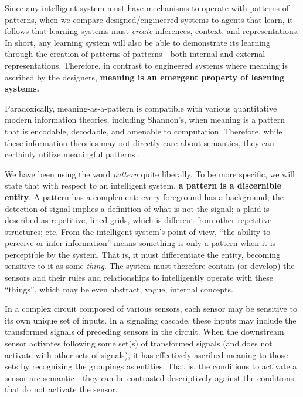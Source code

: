 Since any intelligent system must have mechanisms to operate with patterns of patterns, when we compare designed/engineered systems to agents that learn, it follows that learning systems must \emph{create} inferences, context, and representations.
In short, any learning system will also be able to demonstrate its learning through the creation of patterns of patterns---both internal and external representations.
Therefore, in contrast to engineered systems where meaning is ascribed by the designers, \textbf{meaning is an emergent property of learning systems.}

Paradoxically, meaning-as-a-pattern is compatible with various quantitative modern information theories, including Shannon's, when meaning is a pattern that is encodable, decodable, and amenable to computation.
Therefore, while these information theories may not directly care about semantics, they can certainly utilize meaningful patterns \cite{adriaansCriticalAnalysisFloridi2010, adriaansInformation2020}.

We have been using the word \emph{pattern} quite liberally.
To be more specific, we will state that with respect to an intelligent system, \textbf{a pattern is a discernible entity}.
A pattern has a complement: every foreground has a background; the detection of signal implies a definition of what is not the signal; a plaid is described as repetitive, lined grids, which is different from other repetitive structures; etc.
From the intelligent system's point of view, ``the ability to perceive or infer information'' means something is only a pattern when it is perceptible by the system.
That is, it must differentiate the entity, becoming sensitive to it as some \emph{thing}.
The system must therefore contain (or develop) the sensors and their rules and relationships to intelligently operate with these ``things'', which may be even abstract, vague, internal concepts.


In a complex circuit composed of various sensors, each sensor may be sensitive to its own unique set of inputs.
In a signaling cascade, these inputs may include the transformed signals of preceding sensors in the circuit.
When the downstream sensor activates following some set(s) of transformed signals (and does not activate with other sets of signals), it has effectively ascribed meaning to those sets by recognizing the groupings as entities.
That is, the conditions to activate a sensor are semantic---they can be contrasted descriptively against the conditions that do not activate the sensor.

